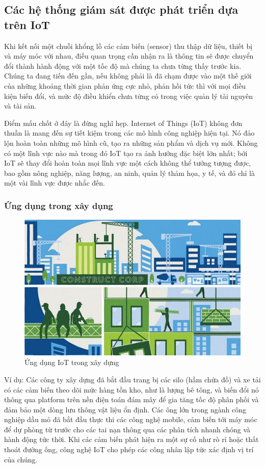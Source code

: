 \subsection{Các hệ thống giám sát được phát triển dựa trên IoT}
Khi kết nối một chuỗi khổng lồ các cảm biến (sensor) thu thập dữ liệu, thiết bị và máy móc với nhau, điều quan trọng cần nhận ra là thông tin sẽ được chuyển đổi thành hành động với một tốc độ mà chúng ta chưa từng thấy trước kia. Chúng ta đang tiến đến gần, nếu không phải là đã chạm được vào một thế giới của những khoảng thời gian phản ứng cực nhỏ, phản hồi tức thì với mọi điều kiện biến đổi, và mức độ điều khiển chưa từng có trong việc quản lý tài nguyên và tài sản.

Điểm mấu chốt ở đây là đừng nghĩ hẹp. Internet of Things (IoT) không đơn thuần là mang đến sự tiết kiệm trong các mô hình công nghiệp hiện tại. Nó đảo lộn hoàn toàn những mô hình cũ, tạo ra những sản phẩm và dịch vụ mới. Không có một lĩnh vực nào mà trong đó IoT tạo ra ảnh hưởng đặc biệt lớn nhất; bởi IoT sẽ thay đổi hoàn toàn mọi lĩnh vực một cách không thể tưởng tượng được, bao gồm nông nghiệp, năng lượng, an ninh, quản lý thảm họa, y tế, và đó chỉ là một vài lĩnh vực được nhắc đến.

\subsubsection*{Ứng dụng trong xây dụng }
\begin{figure}[H] 
	\centering    
	\includegraphics[width=1\textwidth]{pic8}
	\caption[Ứng dụng IoT trong xây dựng ]{Ứng dụng IoT trong xây dựng }
	\label{fig:pic8}
\end{figure}

Ví dụ: Các công ty xây dựng đã bắt đầu trang bị các silo (hầm chứa đồ) và xe tải có các cảm biến theo dõi mức hàng tồn kho, như là lượng bê tông, và biến đổi nó thông qua platform trên nền điện toán đám mây để gia tăng tốc độ phân phối và đảm bảo một dòng lưu thông vật liệu ổn định. Các ông lớn trong ngành công nghiệp dầu mỏ đã bắt đầu thực thi các công nghệ mobile, cảm biến tới máy móc để dự phòng từ trước cho các tai nạn thông qua các phân tích nhanh chóng và hành động tức thời. Khi các cảm biến phát hiện ra một sự cố như rò rỉ hoặc thất thoát đường ống, công nghệ IoT cho phép các công nhân lập tức xác định vị trí của chúng.

